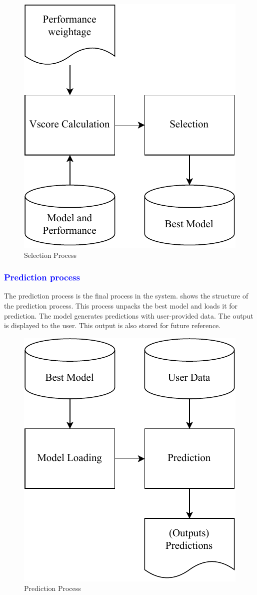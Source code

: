 \documentclass[a4paper,fleqn]{cas-dc}
\newcommand{\responsemodsm}[1]{\textcolor{blue}{#1}}
\newcommand{\subsubsectionb}[1]{\subsubsection{\responsemodsm{#1}}}
\begin{document}
\begin{figure}[ht]
    \centering
    \includegraphics[width=0.7\columnwidth]{selection.pdf}
    \caption{Selection Process}
    \label{fig:selection_process}
\end{figure}

\subsubsectionb{Prediction process}\label{subsubsec:prediction_process}

The prediction process is the final process in the system.  shows the structure of the prediction process. This process unpacks the best model and loads it for prediction. The model generates predictions with user-provided data. The output is displayed to the user. This output is also stored for future reference.

\begin{figure}[ht]
    \centering
    \includegraphics[width=0.7\columnwidth]{prediction.pdf}
    \caption{Prediction Process}
    \label{fig:prediction_process}
\end{figure}
\end{document}
